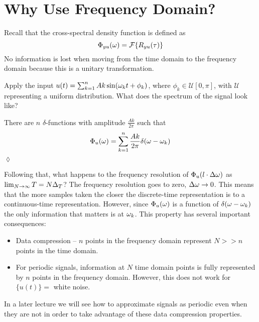 \mainmatter%
\setcounter{page}{1}

\lectureseries[\course]{\course}

\date{October 13, 2009}

\setaddress%

\setcounter{lecture}{5}
\setcounter{chapter}{5}


\section{Why Use Frequency Domain?}
Recall that the cross-spectral density function is defined as
$$\Phi_{yu}(\omega) = \mathcal{F}\{R_{yu}(\tau)\}$$
No information is lost when moving from the time domain to the frequency domain because this is a unitary transformation.

\begin{example}
Apply the input $u(t) = \sum_{k=1}^n Ak\sin(\omega_k t+\phi_k)$, where $\phi_k\in\mathcal{U}[0,\pi]$, with $\mathcal{U}$ representing a uniform distribution.
What does the spectrum of the signal look like?

There are $n$ $\delta$-functions with amplitude $\frac{Ak}{2\pi}$ such that
$$\Phi_u(\omega) = \sum_{k=1}^n \frac{Ak}{2\pi}\delta(\omega-\omega_k)$$
$\lozenge$
\end{example}

Following that, what happens to the frequency resolution of $\Phi_u(l\cdot\Delta\omega)$ as $\lim_{N\to\infty}T = N\Delta_T$? The frequency resolution goes to zero, $\Delta\omega\to 0$.
This means that the more samples taken the closer the discrete-time representation is to a continuous-time representation.
However, since $\Phi_u(\omega)$ is a function of $\delta(\omega-\omega_k)$ the only information that matters is at $\omega_k$.
This property has several important consequences:
\begin{itemize}
\item Data compression -- $n$ points in the frequency domain represent $N>>n$ points in the time domain.%
\item For periodic signals, information at $N$ time domain points is fully represented by $n$ points in the frequency domain.
However, this does not work for $\{u(t)\} =$ white noise.
\end{itemize}
In a later lecture we will see how to approximate signals as periodic even when they are not in order to take advantage of these data compression properties.

